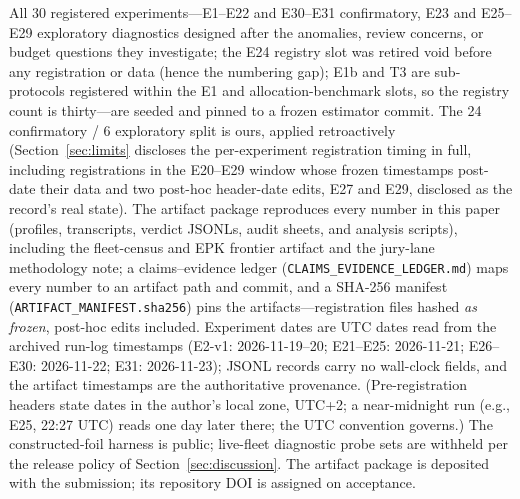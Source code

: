 \documentclass[acmsmall]{acmart}
\theoremstyle{acmdefinition}
\begin{document}
All 30 registered experiments---E1--E22 and E30--E31 confirmatory, E23 and
E25--E29 exploratory diagnostics designed after the anomalies, review
concerns, or budget questions they investigate; the E24 registry slot
was retired void before any registration or data (hence the numbering
gap); E1b and T3 are
sub-protocols registered within the E1 and allocation-benchmark slots, so
the registry count is thirty---are seeded and pinned
to a frozen estimator commit. The 24 confirmatory / 6 exploratory split is
ours, applied retroactively (Section~\ref{sec:limits} discloses the
per-experiment registration timing in full, including registrations in the
E20--E29 window whose frozen timestamps post-date their data and two
post-hoc header-date edits, E27 and E29, disclosed as the record's real
state). The artifact package reproduces every number in this paper
(profiles, transcripts, verdict JSONLs, audit sheets, and analysis
scripts), including the fleet-census
and EPK frontier
artifact and the jury-lane methodology note; a claims--evidence ledger
(\texttt{CLAIMS\_EVIDENCE\_LEDGER.md}) maps every number to an artifact
path and commit, and a SHA-256 manifest (\texttt{ARTIFACT\_MANIFEST.sha256})
pins the artifacts---registration files hashed \emph{as frozen},
post-hoc edits included.
Experiment dates are UTC dates read from the archived run-log
timestamps (E2-v1: 2026-11-19--20; E21--E25: 2026-11-21;
E26--E30: 2026-11-22; E31: 2026-11-23); JSONL records carry no
wall-clock fields, and the artifact timestamps are the authoritative
provenance. (Pre-registration headers state dates in the author's local
zone, UTC+2; a near-midnight run (e.g., E25, 22:27 UTC) reads one day
later there; the UTC convention governs.)
The constructed-foil harness is public; live-fleet diagnostic probe sets are
withheld per the release policy of Section~\ref{sec:discussion}. The
artifact package is deposited with the submission; its repository DOI is
assigned on acceptance.




\appendix



\end{document}
